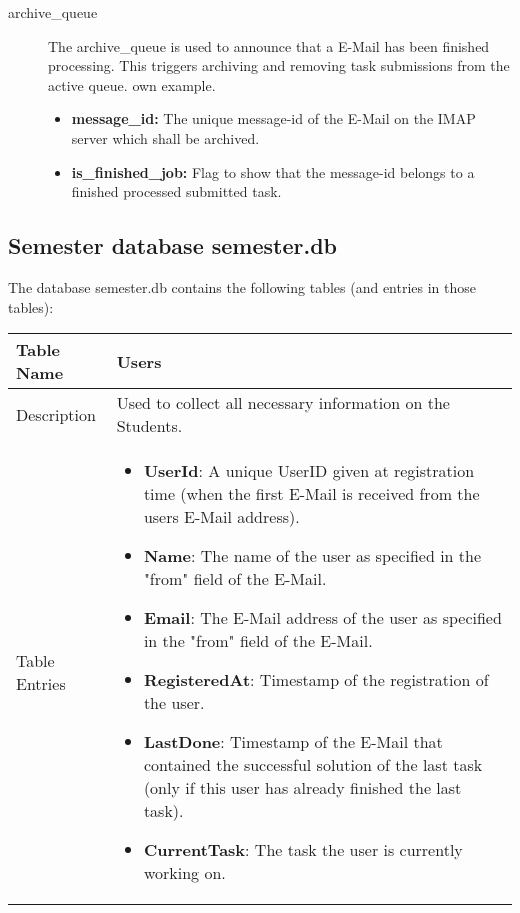 \begin{description}
\item [archive\_queue] The archive\_queue is used to announce that a E-Mail has been finished
    processing. This triggers archiving and removing task submissions from the active queue.
    own example.
    \begin{itemize}
        \item {\bf message\_id:} The unique message-id of the E-Mail on the IMAP server which shall
            be archived.
        \item {\bf is\_finished\_job:} Flag to show that the message-id belongs to a finished
            processed submitted task.
    \end{itemize}
\end{description}

\newpage

\subsection{Semester database semester.db} \label{app:semester.db}

The database semester.db contains the following tables (and entries in those tables):

\begin{tabular}{|p{3cm}|p{10cm}|}
\hline
Table Name & Users \\
\hline
Description & Used to collect all necessary information on the Students.\\
\hline
Table Entries & \begin{itemize}
        \item {\bf UserId}: A unique UserID given at registration time (when the first E-Mail
            is received from the users E-Mail address).
        \item {\bf Name}: The name of the user as specified in the "from" field of the E-Mail.
        \item {\bf Email}: The E-Mail address of the user as specified in the "from" field of the
            E-Mail.
        \item {\bf RegisteredAt}: Timestamp of the registration of the user.
        \item {\bf LastDone}: Timestamp of the E-Mail that contained the successful solution of the
            last task (only if this user has already finished the last task).
        \item {\bf CurrentTask}: The task the user is currently working on.
        \end{itemize} \\
\hline
\end{tabular}


